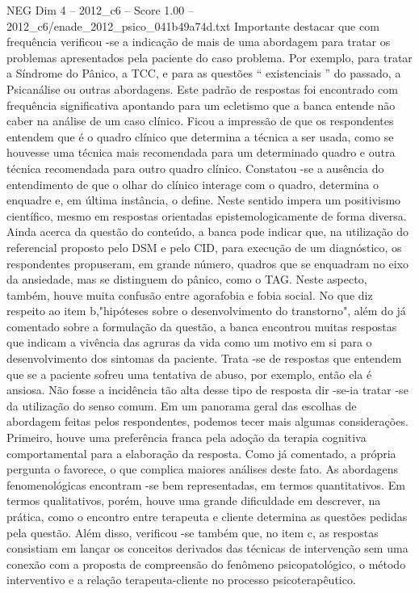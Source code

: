 \begin{textsample}{NEG Dim 4 – 2012\_c6 – Score 1.00 – 2012\_c6/enade\_2012\_psico\_041b49a74d.txt}
Importante destacar que com frequência verificou -se a indicação de mais de uma abordagem para tratar os problemas apresentados pela paciente do caso problema.
Por exemplo, para tratar a Síndrome do Pânico, a TCC, e para as questões “ existenciais ” do passado, a Psicanálise ou outras abordagens.
Este padrão de respostas foi encontrado com frequência significativa apontando para um ecletismo que a banca entende não caber na análise de um caso clínico.
Ficou a impressão de que os respondentes entendem que é o quadro clínico que determina a técnica a ser usada, como se houvesse uma técnica mais recomendada para um determinado quadro e outra técnica recomendada para outro quadro clínico.
Constatou -se a ausência do entendimento de que o olhar do clínico interage com o quadro, determina o enquadre e, em última instância, o define.
Neste sentido impera um positivismo científico, mesmo em respostas orientadas epistemologicamente de forma diversa.
Ainda acerca da questão do conteúdo, a banca pode indicar que, na utilização do referencial proposto pelo DSM e pelo CID, para execução de um diagnóstico, os respondentes propuseram, em grande número, quadros que se enquadram no eixo da ansiedade, mas se distinguem do pânico, como o TAG.
Neste aspecto, também, houve muita confusão entre agorafobia e fobia social.
No que diz respeito ao item b,"hipóteses sobre o desenvolvimento do transtorno", além do já comentado sobre a formulação da questão, a banca encontrou muitas respostas que indicam a vivência das agruras da vida como um motivo em si para o desenvolvimento dos sintomas da paciente.
Trata -se de respostas que entendem que se a paciente sofreu uma tentativa de abuso, por exemplo, então ela é ansiosa.
Não fosse a incidência tão alta desse tipo de resposta dir -se-ia tratar -se da utilização do senso comum.
Em um panorama geral das escolhas de abordagem feitas pelos respondentes, podemos tecer mais algumas considerações.
Primeiro, houve uma preferência franca pela adoção da terapia cognitiva comportamental para a elaboração da resposta.
Como já comentado, a própria pergunta o favorece, o que complica maiores análises deste fato.
As abordagens fenomenológicas encontram -se bem representadas, em termos quantitativos.
Em termos qualitativos, porém, houve uma grande dificuldade em descrever, na prática, como o encontro entre terapeuta e cliente determina as questões pedidas pela questão.
Além disso, verificou -se também que, no item c, as respostas consistiam em lançar os conceitos derivados das técnicas de intervenção sem uma conexão com a proposta de compreensão do fenômeno psicopatológico, o método interventivo e a relação terapeuta-cliente no processo psicoterapêutico.

\end{textsample}
